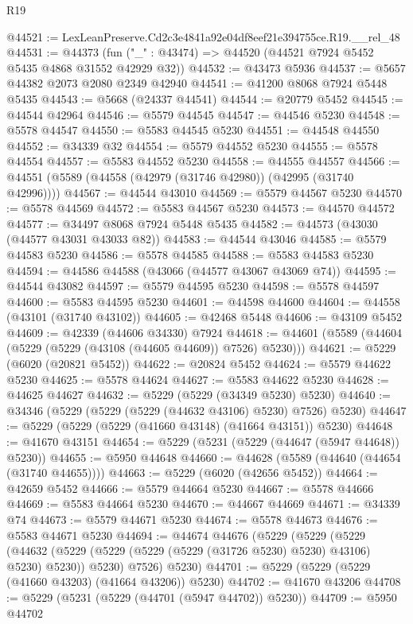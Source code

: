\begin{lexlean}{R19}
\begin{coremodule}
@44521 := LexLeanPreserve.Cd2c3e4841a92e04df8eef21e394755ce.R19.__rel_48
@44531 := @44373 (fun ("_" : @43474) => @44520 (@44521 @7924 @5452 @5435 @4868 @31552 @42929 @32))
@44532 := @43473 @5936
@44537 := @5657 @44382 @2073 @2080 @2349 @42940
@44541 := @41200 @8068 @7924 @5448 @5435
@44543 := @5668 (@24337 @44541)
@44544 := @20779 @5452
@44545 := @44544 @42964
@44546 := @5579 @44545
@44547 := @44546 @5230
@44548 := @5578 @44547
@44550 := @5583 @44545 @5230
@44551 := @44548 @44550
@44552 := @34339 @32
@44554 := @5579 @44552 @5230
@44555 := @5578 @44554
@44557 := @5583 @44552 @5230
@44558 := @44555 @44557
@44566 := @44551 (@5589 (@44558 (@42979 (@31746 @42980)) (@42995 (@31740 @42996))))
@44567 := @44544 @43010
@44569 := @5579 @44567 @5230
@44570 := @5578 @44569
@44572 := @5583 @44567 @5230
@44573 := @44570 @44572
@44577 := @34497 @8068 @7924 @5448 @5435
@44582 := @44573 (@43030 (@44577 @43031 @43033 @82))
@44583 := @44544 @43046
@44585 := @5579 @44583 @5230
@44586 := @5578 @44585
@44588 := @5583 @44583 @5230
@44594 := @44586 @44588 (@43066 (@44577 @43067 @43069 @74))
@44595 := @44544 @43082
@44597 := @5579 @44595 @5230
@44598 := @5578 @44597
@44600 := @5583 @44595 @5230
@44601 := @44598 @44600
@44604 := @44558 (@43101 (@31740 @43102))
@44605 := @42468 @5448
@44606 := @43109 @5452
@44609 := @42339 (@44606 @34330) @7924
@44618 := @44601 (@5589 (@44604 (@5229 (@5229 (@43108 (@44605 @44609)) @7526) @5230)))
@44621 := @5229 (@6020 (@20821 @5452))
@44622 := @20824 @5452
@44624 := @5579 @44622 @5230
@44625 := @5578 @44624
@44627 := @5583 @44622 @5230
@44628 := @44625 @44627
@44632 := @5229 (@5229 (@34349 @5230) @5230)
@44640 := @34346 (@5229 (@5229 (@5229 (@44632 @43106) @5230) @7526) @5230)
@44647 := @5229 (@5229 (@5229 (@41660 @43148) (@41664 @43151)) @5230)
@44648 := @41670 @43151
@44654 := @5229 (@5231 (@5229 (@44647 (@5947 @44648)) @5230))
@44655 := @5950 @44648
@44660 := @44628 (@5589 (@44640 (@44654 (@31740 @44655))))
@44663 := @5229 (@6020 (@42656 @5452))
@44664 := @42659 @5452
@44666 := @5579 @44664 @5230
@44667 := @5578 @44666
@44669 := @5583 @44664 @5230
@44670 := @44667 @44669
@44671 := @34339 @74
@44673 := @5579 @44671 @5230
@44674 := @5578 @44673
@44676 := @5583 @44671 @5230
@44694 := @44674
    @44676
    (@5229
      (@5229
        (@5229
          (@44632 (@5229 (@5229 (@5229 (@5229 (@31726 @5230) @5230) @43106) @5230) @5230))
          @5230)
        @7526)
      @5230)
@44701 := @5229 (@5229 (@5229 (@41660 @43203) (@41664 @43206)) @5230)
@44702 := @41670 @43206
@44708 := @5229 (@5231 (@5229 (@44701 (@5947 @44702)) @5230))
@44709 := @5950 @44702

\end{coremodule}
\end{lexlean}
